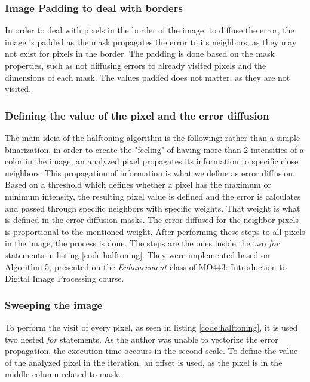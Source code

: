 \documentclass[]{IEEEtran}
\begin{document}
\subsubsection{Image Padding to deal with borders}
In order to deal with pixels in the border of the image, to diffuse the error, the image is padded as the mask propagates the error to its neighbors, as they may not exist for pixels in the border. The padding is done based on the mask properties, such as not diffusing errors to already visited pixels and the dimensions of each mask. The values padded does not matter, as they are not visited.

\subsubsection{Defining the value of the pixel and the error diffusion}
The main ideia of the halftoning algorithm is the following: rather than a simple binarization, in order to create the "feeling" of having more than 2 intensities of a color in the image, an analyzed pixel propagates its information to specific close neighbors. This propagation of information is what we define as error diffusion. Based on a threshold which defines whether a pixel has the maximum or minimum intensity, the resulting pixel value is defined and the error is calculates and passed through specific neighbors with specific weights. That weight is what is defined in the error diffusion masks. The error diffused for the neighbor pixels is proportional to the mentioned weight. After performing these steps to all pixels in the image, the process is done. The steps are the ones inside the two \textit{for} statements in listing \ref{code:halftoning}. They were implemented based on Algorithm 5, presented on the \textit{Enhancement} class of MO443: Introduction to Digital Image Processing course.  

\subsubsection{Sweeping the image}
To perform the visit of every pixel, as seen in listing \ref{code:halftoning}, it is used two nested \textit{for} statements. As the author was unable to vectorize the error propagation, the execution time occours in the second scale. To define the value of the analyzed pixel in the iteration, an  offset is used, as the pixel is in the middle column related to mask.



\end{document}

